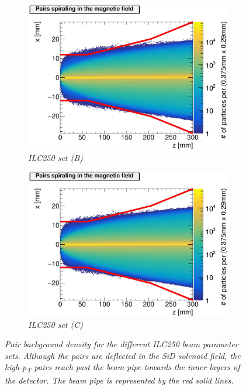\begin{figure}[h]
\begin{subfigure}[t]{0.49\textwidth}
\includegraphics[width=\textwidth]{figures/Helix_tracks_xz_50bunches_250GeV_5T_Reduced_Emittance_x_Reduced_Beta_x-1.jpg}
\caption{\textit{ILC250 set (B)}}
\end{subfigure}
\hspace*{0.08cm}
\begin{subfigure}[t]{0.49\textwidth}
\centering
\includegraphics[width=\textwidth]{figures/Helix_tracks_xz_50bunches_250GeV_5T_Reduced_Emittance_x_Reduced_Beta_x_Increased_Beta_y-1.jpg}
\caption{\textit{ILC250 set (C)}}
\end{subfigure}
\caption{\textit{Pair background density for the different ILC250 beam parameter sets. Although the pairs are deflected in the SiD solenoid field, the high-p\textsubscript{T} pairs reach past the beam pipe towards the inner layers of the detector. The beam pipe is represented by the red solid lines.}}
\label{fig:Envelopes}
\end{figure}



